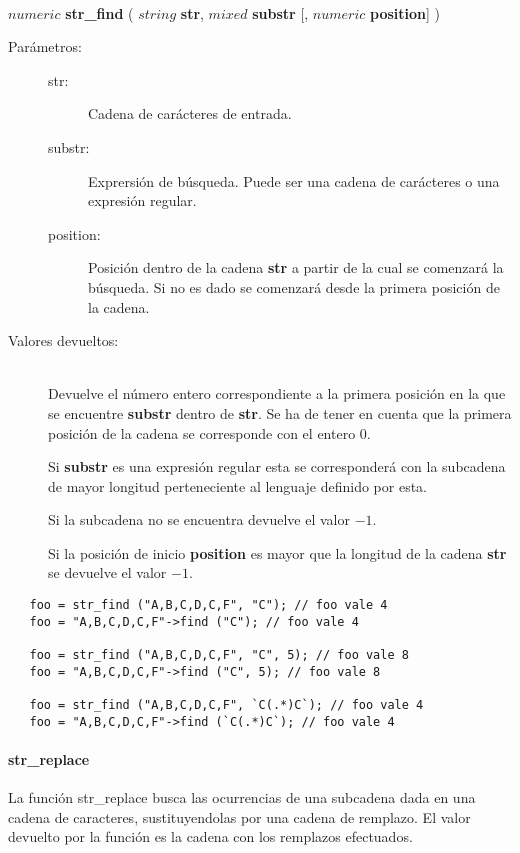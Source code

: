 \begin{framed}
\hfill \\ $numeric$ \textbf{str\_find} ( $string$ \textbf{str}, $mixed$ \textbf{substr} [, $numeric$ \textbf{position}] )  
\begin{description}
\item [Parámetros:] \hfill 
   \begin{description}
   \item[str:] Cadena de carácteres de entrada.
   \item[substr:] Exprersión de búsqueda. Puede ser una cadena de carácteres o una expresión regular.  
   \item[position:] Posición dentro de la cadena \textbf{str} a partir de la cual se comenzará la búsqueda. Si no es dado 
   se comenzará desde la primera posición de la cadena.
   \end{description}
\item[Valores devueltos:] \hfill \\
   Devuelve el número entero correspondiente a la primera posición en la que se encuentre \textbf{substr} dentro de \textbf{str}. 
   Se ha de tener en cuenta que la primera posición de la cadena se corresponde con el entero $0$.
   
   Si \textbf{substr} es una expresión regular esta se corresponderá con la subcadena de mayor longitud perteneciente al 
   lenguaje definido por esta. 
   
   Si la subcadena no se encuentra devuelve el valor $-1$. 
   
   Si la posición de inicio \textbf{position} es mayor que la longitud de la cadena \textbf{str} se devuelve el valor $-1$. 
\end{description}
\end{framed}

\begin{lstlisting}
   foo = str_find ("A,B,C,D,C,F", "C"); // foo vale 4  
   foo = "A,B,C,D,C,F"->find ("C"); // foo vale 4

   foo = str_find ("A,B,C,D,C,F", "C", 5); // foo vale 8 
   foo = "A,B,C,D,C,F"->find ("C", 5); // foo vale 8
   
   foo = str_find ("A,B,C,D,C,F", `C(.*)C`); // foo vale 4
   foo = "A,B,C,D,C,F"->find (`C(.*)C`); // foo vale 4
\end{lstlisting}


\paragraph {str\_replace}
La función str\_replace busca las ocurrencias de una subcadena dada en una cadena de caracteres, sustituyendolas
por una cadena de remplazo. El valor devuelto por la función es la cadena con los remplazos efectuados. \\

